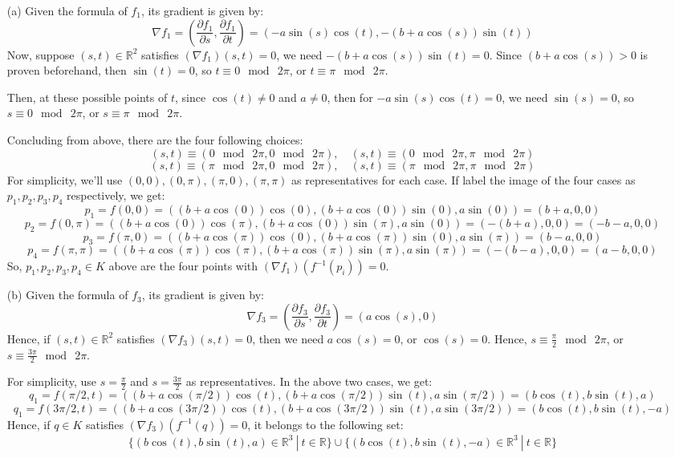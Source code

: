 \documentclass{article}
\begin{document}
\begin{itemize}
    \item[(a)] Given the formula of $f_1$, its gradient is given by:
    $$\nabla f_1 = \left(\frac{\partial f_1}{\partial s},\frac{\partial f_1}{\partial t}\right)=(-a\sin(s)\cos(t), -(b+a\cos(s))\sin(t))$$
    Now, suppose $(s,t)\in \mathbb{R}^2$ satisfies $(\nabla f_1)(s,t)=0$, we need $-(b+a\cos(s))\sin(t)=0$. Since $(b+a\cos(s))>0$ is proven beforehand, then $\sin(t)=0$,
    so $t\equiv 0\mod\ 2\pi$, or $t\equiv \pi\mod\ 2\pi$.

    Then, at these possible points of $t$, since $\cos(t)\neq 0$ and $a\neq 0$, then for $-a\sin(s)\cos(t)=0$, we need $\sin(s)=0$, so $s\equiv 0\mod\ 2\pi$, or $s\equiv \pi\mod\ 2\pi$.

    Concluding from above, there are the four following choices:
    $$(s,t)\equiv (0\mod\ 2\pi, 0\mod\ 2\pi),\quad (s,t)\equiv (0\mod\ 2\pi, \pi\mod\ 2\pi)$$
    $$(s,t)\equiv (\pi\mod\ 2\pi, 0\mod\ 2\pi),\quad (s,t)\equiv (\pi\mod\ 2\pi, \pi\mod\ 2\pi)$$
    For simplicity, we'll use $(0,0),(0,\pi),(\pi,0),(\pi,\pi)$ as representatives for each case. If label the image of the four cases as $p_1,p_2,p_3,p_4$ respectively, we get:
    $$p_1=f(0,0) = ((b+a\cos(0))\cos(0),(b+a\cos(0))\sin(0),a\sin(0)) = (b+a,0,0)$$
    $$p_2=f(0,\pi) = ((b+a\cos(0))\cos(\pi),(b+a\cos(0))\sin(\pi),a\sin(0)) = (-(b+a),0,0) = (-b-a,0,0)$$
    $$p_3=f(\pi,0) = ((b+a\cos(\pi))\cos(0),(b+a\cos(\pi))\sin(0),a\sin(\pi)) = (b-a,0,0)$$
    $$p_4=f(\pi,\pi) = ((b+a\cos(\pi))\cos(\pi),(b+a\cos(\pi))\sin(\pi),a\sin(\pi)) = (-(b-a),0,0)=(a-b,0,0)$$
    So, $p_1,p_2,p_3,p_4\in K$ above are the four points with $(\nabla f_1)(f^{-1}(p_i)) = 0$.

    \hfil

    \item[(b)] Given the formula of $f_3$, its gradient is given by:
    $$\nabla f_3 = \left(\frac{\partial f_3}{\partial s},\frac{\partial f_3}{\partial t}\right) = (a\cos(s),0)$$
    Hence, if $(s,t)\in\mathbb{R}^2$ satisfies $(\nabla f_3)(s,t)=0$, then we need $a\cos(s)=0$, or $\cos(s)=0$. Hence, $s\equiv \frac{\pi}{2}\mod\ 2\pi$, or $s\equiv \frac{3\pi}{2}\mod\ 2\pi$.

    For simplicity, use $s=\frac{\pi}{2}$ and $s=\frac{3\pi}{2}$ as representatives. 
    In the above two cases, we get:
    $$q_1 = f(\pi/2,t) = ((b+a\cos(\pi/2))\cos(t),(b+a\cos(\pi/2))\sin(t),a\sin(\pi/2)) = (b\cos(t),b\sin(t),a)$$
    $$q_1 = f(3\pi/2,t) = ((b+a\cos(3\pi/2))\cos(t),(b+a\cos(3\pi/2))\sin(t),a\sin(3\pi/2)) = (b\cos(t),b\sin(t),-a)$$
    Hence, if $q\in K$ satisfies $(\nabla f_3)(f^{-1}(q))=0$, it belongs to the following set:
    $$\{(b\cos(t),b\sin(t),a)\in\mathbb{R}^3\ |\ t\in\mathbb{R}\}\cup \{(b\cos(t),b\sin(t),-a)\in\mathbb{R}^3\ |\ t\in\mathbb{R}\}$$


\end{itemize}
\end{document}
